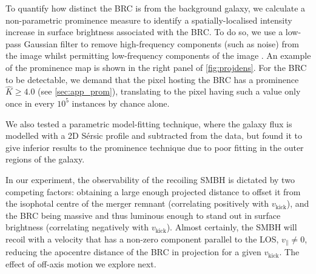 \documentclass[twocolumn]{aastex631}
\newcommand{\vk}{\ensuremath{v_\mathrm{kick}}}                %
\begin{document}
To quantify how distinct the BRC is from the background galaxy, we calculate a non-parametric prominence measure to identify a spatially-localised intensity increase in surface brightness associated with the BRC.
To do so, we use a low-pass Gaussian filter to remove high-frequency components (such as noise) from the image whilst permitting low-frequency components of the image \citep[e.g.][see \autoref{sec:app_prom}]{davies90}. 
An example of the prominence map is shown in the right panel of \autoref{fig:projdens}.
For the BRC to be detectable, we demand that the pixel hosting the BRC has a prominence $\hat{K}\geq4.0$ (see \autoref{sec:app_prom}), translating to the pixel having such a value only once in every $10^5$ instances by chance alone.

We also tested a parametric model-fitting technique, where the galaxy flux is modelled with a 2D S\'ersic profile and subtracted from the data, but found it to give inferior results to the prominence technique due to poor fitting in the outer regions of the galaxy.

In our experiment, the observability of the recoiling SMBH is dictated by two competing factors: obtaining a large enough projected distance to offset it from the isophotal centre of the merger remnant (correlating positively with $\vk$), and the BRC being massive and thus luminous enough to stand out in surface brightness (correlating negatively with $\vk$).
Almost certainly, the SMBH will recoil with a velocity that has a non-zero component parallel to the LOS,  $v_\parallel \neq 0$, reducing the apocentre distance of the BRC in projection for a given $\vk$.
The effect of off-axis motion we explore next.
\end{document}
